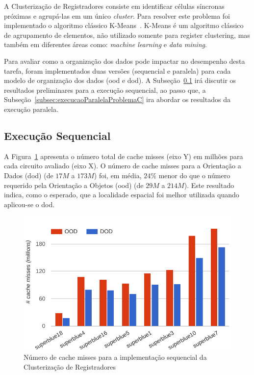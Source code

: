 A Clusterização de Registradores consiste em identificar células síncronas próximas e agrupá-las em um único \textit{cluster}. Para resolver este problema foi implementado o algoritmo clássico K-Means~\cite{selim1984k}. K-Means é um algoritmo clássico de agrupamento de elementos, não utilizado somente para register clustering, mas também em diferentes áreas como: \textit{machine learning} e \textit{data mining}.

Para avaliar como a organização dos dados pode impactar no desempenho desta tarefa, foram implementados duas versões (sequencial e paralela) para cada modelo de organização dos dados (\ac{ood} e \ac{dod}).
A Subseção~\ref{subsec:execucaoSequencialProblemaC} irá discutir os resultados preliminares para a execução sequencial, ao passo que, a Subseção~\ref{subsec:execucaoParalelaProblemaC} ira abordar os resultados da execução paralela.

\subsection{Execução Sequencial}
\label{subsec:execucaoSequencialProblemaC}

A Figura~\ref{fig:missProblemC_sequential_rtree} apresenta o número total de cache misses (eixo Y) em milhões para cada circuito avaliado (eixo X).
O número de cache misses para a Orientação a Dados (\ac{dod}) (de $17M$ a $173M$) foi, em média, $24\%$ menor do que o número requerido pela Orientação a Objetos (\ac{ood}) (de $29M$ a $214M$).
Este resultado indica, como o esperado, que a localidade espacial foi melhor utilizada quando aplicou-se o \ac{dod}.

\begin{figure}[ht]
    \centering
    \includegraphics[width=0.7\linewidth]{img/results/missProblemC_sequential_rtree}
    \caption[Cache misses Problema~C versão sequencial]{Número de cache misses para a implementação sequencial da Clusterização de Registradores}
    \label{fig:missProblemC_sequential_rtree}
\end{figure}

